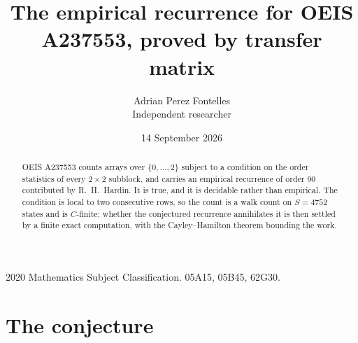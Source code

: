 \documentclass[11pt,a4paper]{article}
\title{The empirical recurrence for OEIS A237553, proved by transfer matrix}
\author{Adrian Perez Fontelles\\ \small Independent researcher}
\date{14 September 2026}
\theoremstyle{plain}
\theoremstyle{definition}
\begin{document}
\maketitle

\begin{abstract}
OEIS A237553 counts arrays over $\{0,\dots,2\}$ subject to a condition on the order
statistics of every $2\times2$ subblock, and carries an empirical recurrence of order
$90$ contributed by R.~H.~Hardin. It is true, and it is decidable rather than empirical.
The condition is local to two consecutive rows, so the count is a walk count on $S=4752$
states and is $C$-finite; whether the conjectured recurrence annihilates it is then settled by
a finite exact computation, with the Cayley--Hamilton theorem bounding the work.
\end{abstract}

\noindent\small 2020 Mathematics Subject Classification. 05A15, 05B45, 62G30.\normalsize

\section{The conjecture}
\end{document}
